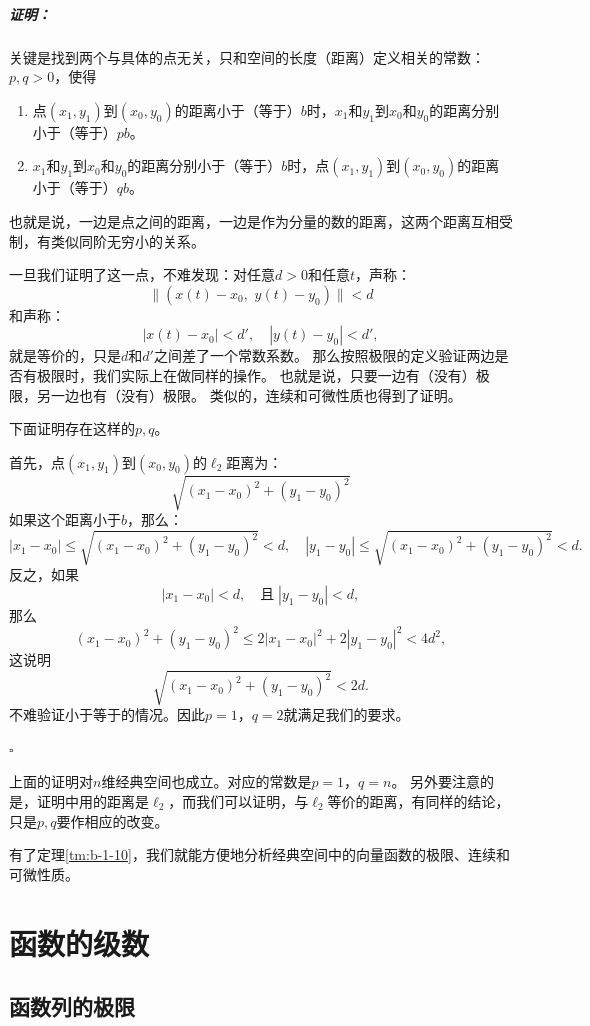 \documentclass[12pt,UTF8]{ctexbook}
\theoremstyle{definition}
\theoremstyle{plain}
\renewenvironment{proof}{\paragraph{\textbf{证明：}}}{\hfill$\square$}
\begin{document}
\begin{appendix}
\begin{proof}
    关键是找到两个与具体的点无关，只和空间的长度（距离）定义相关的常数：$p,q>0$，使得
    \begin{enumerate}
        \item 点$(x_1, y_1)$到$(x_0, y_0)$的距离小于（等于）$b$时，$x_1$和$y_1$到$x_0$和$y_0$的距离分别小于（等于）$pb$。
        \item $x_1$和$y_1$到$x_0$和$y_0$的距离分别小于（等于）$b$时，点$(x_1, y_1)$到$(x_0, y_0)$的距离小于（等于）$qb$。
    \end{enumerate}
    也就是说，一边是点之间的距离，一边是作为分量的数的距离，这两个距离互相受制，有类似同阶无穷小的关系。
    
    一旦我们证明了这一点，不难发现：对任意$d>0$和任意$t$，声称：
    $$ \|(x(t) - x_0,\,\, y(t) - y_0)\| < d $$
    和声称：
    $$ |x(t) - x_0| < d' , \quad |y(t) - y_0 | < d', $$
    就是等价的，只是$d$和$d'$之间差了一个常数系数。
    那么按照极限的定义验证两边是否有极限时，我们实际上在做同样的操作。
    也就是说，只要一边有（没有）极限，另一边也有（没有）极限。
    类似的，连续和可微性质也得到了证明。

    下面证明存在这样的$p,q$。

    首先，点$(x_1, y_1)$到$(x_0, y_0)$的$\ell_2$距离为：
    $$ \sqrt{(x_1 - x_0)^2 + ( y_1 - y_0)^2} $$
    如果这个距离小于$b$，那么：
    $$ |x_1 - x_0| \leqslant \sqrt{(x_1 - x_0)^2 + ( y_1 - y_0)^2} < d, \quad |y_1 - y_0| \leqslant \sqrt{(x_1 - x_0)^2 + ( y_1 - y_0)^2} < d. $$
    反之，如果
    $$ |x_1 - x_0| < d, \quad \mbox{且}\; |y_1 - y_0| < d, $$
    那么
    $$ (x_1 - x_0)^2 + ( y_1 - y_0)^2 \leqslant 2|x_1 - x_0|^2 + 2|y_1 - y_0|^2 < 4d^2, $$
    这说明
    $$ \sqrt{(x_1 - x_0)^2 + ( y_1 - y_0)^2} < 2d. $$
    不难验证小于等于的情况。因此$p = 1$，$q = 2$就满足我们的要求。

\end{proof}

上面的证明对$n$维经典空间也成立。对应的常数是$p = 1$，$q = n$。
另外要注意的是，证明中用的距离是$\ell_2$，而我们可以证明，与$\ell_2$等价的距离，有同样的结论，只是$p,q$要作相应的改变。

有了定理\ref{tm:b-1-10}，我们就能方便地分析经典空间中的向量函数的极限、连续和可微性质。

\chapter{函数的级数}

\section{函数列的极限}


\end{appendix}
\end{document}
